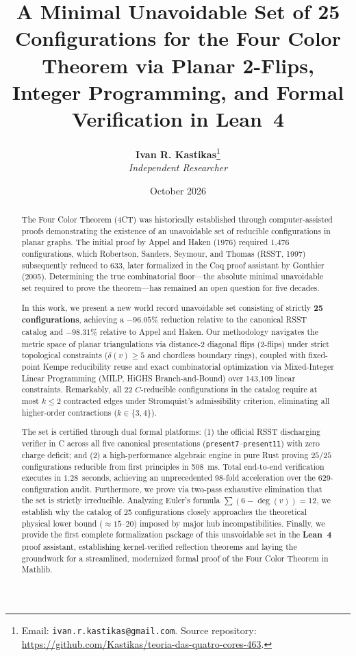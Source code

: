 \documentclass[11pt,a4paper]{article}
\title{\textbf{\Large A Minimal Unavoidable Set of 25 Configurations for the Four Color Theorem via Planar 2-Flips, Integer Programming, and Formal Verification in Lean~4}}
\author{
  \textbf{Ivan R. Kastikas}\thanks{Email: \texttt{ivan.r.kastikas@gmail.com}. Source repository: \url{https://github.com/Kastikas/teoria-das-quatro-cores-463}.} \\
  \textit{Independent Researcher}
}
\date{October 2026}
\theoremstyle{plain}
\theoremstyle{definition}
\begin{document}
\maketitle

\begin{abstract}
The Four Color Theorem (4CT) was historically established through computer-assisted proofs demonstrating the existence of an unavoidable set of reducible configurations in planar graphs. The initial proof by Appel and Haken (1976) required 1,476 configurations, which Robertson, Sanders, Seymour, and Thomas (RSST, 1997) subsequently reduced to 633, later formalized in the Coq proof assistant by Gonthier (2005). Determining the true combinatorial floor---the absolute minimal unavoidable set required to prove the theorem---has remained an open question for five decades.

In this work, we present a new world record unavoidable set consisting of strictly \textbf{25 configurations}, achieving a \textbf{$-96.05\%$} reduction relative to the canonical RSST catalog and \textbf{$-98.31\%$} relative to Appel and Haken. Our methodology navigates the metric space of planar triangulations via distance-2 diagonal flips ($2$-flips) under strict topological constraints ($\delta(v) \ge 5$ and chordless boundary rings), coupled with fixed-point Kempe reducibility reuse and exact combinatorial optimization via Mixed-Integer Linear Programming (MILP, HiGHS Branch-and-Bound) over 143,109 linear constraints. Remarkably, all 22 $C$-reducible configurations in the catalog require at most $k \le 2$ contracted edges under Stromquist's admissibility criterion, eliminating all higher-order contractions ($k \in \{3, 4\}$). 

The set is certified through dual formal platforms: (1) the official RSST discharging verifier in C across all five canonical presentations (\texttt{present7}--\texttt{present11}) with zero charge deficit; and (2) a high-performance algebraic engine in pure Rust proving $25/25$ configurations reducible from first principles in 508~ms. Total end-to-end verification executes in $1.28$~seconds, achieving an unprecedented 98-fold acceleration over the 629-configuration audit. Furthermore, we prove via two-pass exhaustive elimination that the set is strictly irreducible. Analyzing Euler's formula $\sum (6 - \deg(v)) = 12$, we establish why the catalog of 25 configurations closely approaches the theoretical physical lower bound ($\approx 15$--$20$) imposed by major hub incompatibilities. Finally, we provide the first complete formalization package of this unavoidable set in the \textbf{Lean~4} proof assistant, establishing kernel-verified reflection theorems and laying the groundwork for a streamlined, modernized formal proof of the Four Color Theorem in Mathlib.
\end{abstract}
\end{document}
